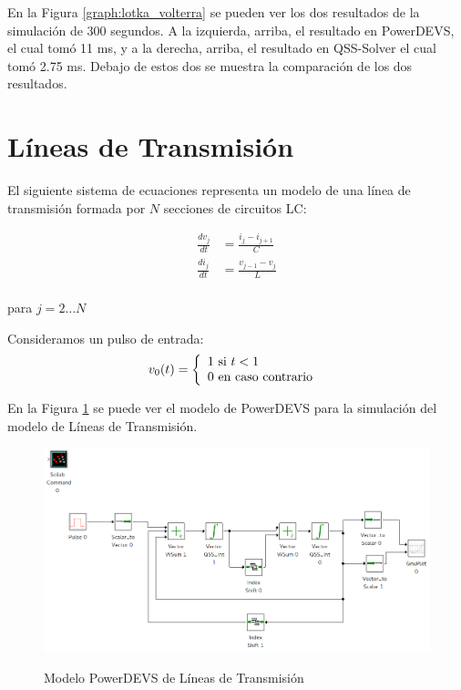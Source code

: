 En la Figura \ref{graph:lotka_volterra} se pueden ver los dos resultados de la simulación de 300 segundos. A la izquierda, arriba, el resultado en PowerDEVS, 
	el cual tomó 11 ms, y a la derecha, arriba, el resultado en QSS-Solver el cual tomó 2.75 ms. Debajo de estos dos se muestra la comparación de los dos resultados.

\section{Líneas de Transmisión}
	El siguiente sistema de ecuaciones representa un modelo de una línea de transmisión formada por $N$ secciones de circuitos LC:

\begin{equation}
\begin{split}
\frac{d v_{j}}{d t} &= \frac{i_{j} - i_{j+1}}{C} \\
\frac{d i_{j}}{d t} &= \frac{v_{j-1} - v_{j}}{L} \\	
\end{split}
\end{equation}

para $j = 2 \dots N$

Consideramos un pulso de entrada:
\begin{equation}
v_0(t) = \left\{ 
  \begin{array}{l l}
    1 \text{ si } t < 1 \\
    0 \text{ en caso contrario }
  \end{array} \right.
\end{equation}

En la Figura \ref{model:lclines} se puede ver el modelo de PowerDEVS para la simulación del modelo de Líneas de Transmisión.

\begin{figure}[H]
 \includegraphics[width=0.75\linewidth]{lclines}
\label{model:lclines}
\caption{Modelo PowerDEVS de Líneas de Transmisión}
\end{figure}

